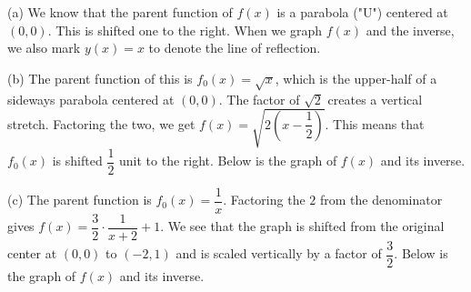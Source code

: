\documentclass[lang=en,11pt]{elegantbook}
\begin{document}
(a) We know that the parent function of $f(x)$ is a parabola ("U") centered at $(0,0)$.  This is shifted one to the right.  When we graph $f(x)$ and the inverse, we also mark $y(x)=x$ to denote the line of reflection.
\begin{figure}[!h]
    \centering
\end{figure}

(b) The parent function of this is $f_0(x)=\sqrt{x}$, which is the upper-half of a sideways parabola centered at $(0,0)$.  The factor of $\sqrt{2}$ creates a vertical stretch.  Factoring the two, we get $f(x)=\sqrt{2\left(x-\dfrac{1}{2}\right)}$.  This means that $f_0(x)$ is shifted $\dfrac{1}{2}$ unit to the right.  Below is the graph of $f(x)$ and its inverse.

\begin{figure}[!h]
    \centering
\end{figure}

(c) The parent function is $f_0(x)=\dfrac{1}{x}$.  Factoring the $2$ from the denominator gives $f(x)=\dfrac{3}{2}\cdot \dfrac{1}{x+2}+1$. We see that the graph is shifted from the original center at $(0,0)$ to $(-2,1)$ and is scaled vertically by a factor of $\dfrac{3}{2}$.  Below is the graph of $f(x)$ and its inverse.
\end{document}
